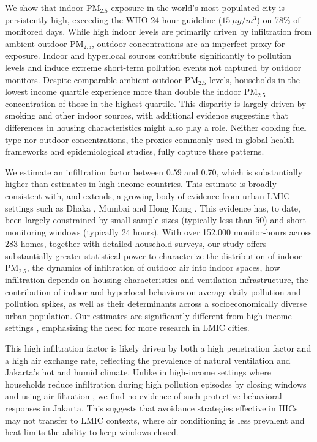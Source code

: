 \documentclass[9pt,twocolumn,twoside]{pnas-new}
\begin{document}
We show that indoor PM$_{2.5}$ exposure in the world's most populated city is persistently high, exceeding the WHO 24-hour guideline ($15~\mu g/m^3$) on 78\% of monitored days. While high indoor levels are primarily driven by infiltration from ambient outdoor PM$_{2.5}$, outdoor concentrations are an imperfect proxy for exposure. Indoor and hyperlocal sources contribute significantly to pollution levels and induce extreme short-term pollution events not captured by outdoor monitors. Despite comparable ambient outdoor PM$_{2.5}$ levels, households in the lowest income quartile experience more than double the indoor PM$_{2.5}$ concentration of those in the highest quartile. This disparity is largely driven by smoking and other indoor sources, with additional evidence suggesting that differences in housing characteristics might also play a role. Neither cooking fuel type nor outdoor concentrations, the proxies commonly used in global health frameworks and epidemiological studies, fully capture these patterns.

We estimate an infiltration factor between 0.59 and 0.70, which is substantially higher than estimates in high-income countries.
This estimate is broadly consistent with, and extends, a growing body of evidence from urban LMIC settings such as Dhaka \citep{Sahaetal2025}, Mumbai \citep{Anandetal2022} and Hong Kong \citep{Hossainetal2021}. This evidence has, to date, been largely constrained by small sample sizes (typically less than 50) and short monitoring windows (typically 24 hours). 
With over 152,000 monitor-hours across 283 homes, together with detailed household surveys, our study offers substantially greater statistical power to characterize the distribution of indoor PM$_{2.5}$, the dynamics of infiltration of outdoor air into indoor spaces, how infiltration depends on housing characteristics and ventilation infrastructure, the contribution of indoor and hyperlocal behaviors on average daily pollution and pollution spikes, as well as their determinants across a socioeconomically diverse urban population. Our estimates are significantly different from high-income settings \citep{krebs_using_2021, lunderberg_assessing_2023, burke_exposures_2022}, emphasizing the need for more research in LMIC cities.

This high infiltration factor is likely driven by both a high penetration factor and a high air exchange rate, reflecting the prevalence of natural ventilation and Jakarta's hot and humid climate. Unlike in high-income settings where households reduce infiltration during high pollution episodes by closing windows and using air filtration \citep{burke_exposures_2022}, we find no evidence of such protective behavioral responses in Jakarta. This suggests that avoidance strategies effective in HICs may not transfer to LMIC contexts, where air conditioning is less prevalent and heat limits the ability to keep windows closed.
\end{document}
